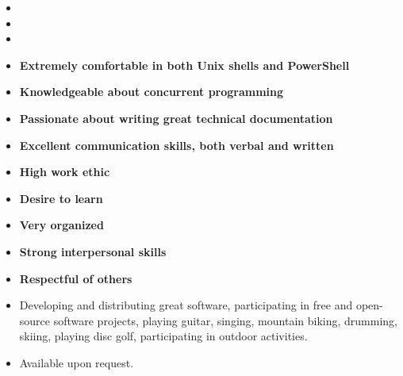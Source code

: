 \documentclass[letterpaper,10pt]{article}
\begin{document}
\begin{itemize}
\item[] 
\item[] 
\item[] 
\item[] \textbf{Extremely comfortable in both Unix shells and PowerShell}
\item[] \textbf{Knowledgeable about concurrent programming}
\item[] \textbf{Passionate about writing great technical documentation}
\item[] \textbf{Excellent communication skills, both verbal and written}
\item[] \textbf{High work ethic}
\item[] \textbf{Desire to learn}
\item[] \textbf{Very organized}
\item[] \textbf{Strong interpersonal skills}
\item[] \textbf{Respectful of others}
\end{itemize}

\goodbreak

\begin{itemize}
\item[] Developing and distributing great software, participating in free and open-source software projects, playing guitar, singing, mountain biking, drumming, skiing, playing disc golf, participating in outdoor activities.
\end{itemize}

\goodbreak

\begin{itemize}
\item[] Available upon request.
\end{itemize}
\end{document}

